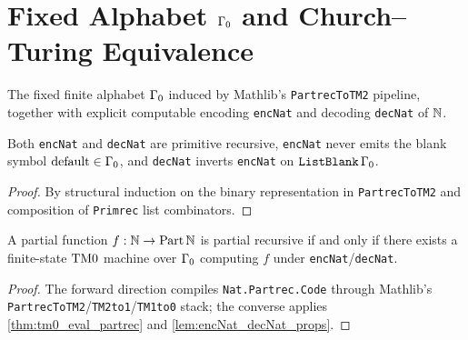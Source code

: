 \chapter{Fixed Alphabet $\Gamma_0$ and Church--Turing Equivalence}

\begin{definition}
  \label{def:gamma0_codec}
  \leanok
  The fixed finite alphabet $\Gamma_0$ induced by Mathlib's \texttt{PartrecToTM2} pipeline, together with explicit computable encoding \texttt{encNat} and decoding \texttt{decNat} of $\mathbb{N}$.
\end{definition}

\begin{lemma}
  \label{lem:encNat_decNat_props}
  \leanok
  Both \texttt{encNat} and \texttt{decNat} are primitive recursive, \texttt{encNat} never emits the blank symbol $\mathrm{default} \in \Gamma_0$, and \texttt{decNat} inverts \texttt{encNat} on $\texttt{ListBlank}\,\Gamma_0$.
\end{lemma}
\begin{proof}
  \leanok
  By structural induction on the binary representation in \texttt{PartrecToTM2} and composition of \texttt{Primrec} list combinators.
\end{proof}

\begin{theorem}
  \label{thm:nat_partrec_iff_tm0}
  \leanok
  A partial function $f : \mathbb{N} \to \mathrm{Part}\,\mathbb{N}$ is partial recursive if and only if there exists a finite-state $\mathrm{TM0}$ machine over $\Gamma_0$ computing $f$ under \texttt{encNat}/\texttt{decNat}.
\end{theorem}
\begin{proof}
  \leanok
  The forward direction compiles \texttt{Nat.Partrec.Code} through Mathlib's \texttt{PartrecToTM2}/\texttt{TM2to1}/\texttt{TM1to0} stack; the converse applies \ref{thm:tm0_eval_partrec} and \ref{lem:encNat_decNat_props}.
\end{proof}

